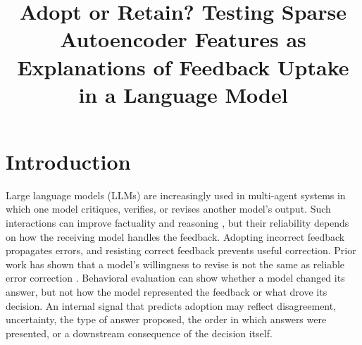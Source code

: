 \documentclass[pdflatex,sn-mathphys-num]{sn-jnl}
\theoremstyle{thmstylethree}%
\begin{document}
\title[Adopt or Retain?]{Adopt or Retain? Testing Sparse Autoencoder Features
as Explanations of Feedback Uptake in a Language Model}

\author[1]{ }
\author[1]{ }
\author[1]{ }
\author[1]{ }





\maketitle

\section{Introduction}\label{sec:introduction}

Large language models (LLMs) are increasingly used in multi-agent systems in which one model critiques, verifies, or revises another model's output.
Such interactions can improve factuality and reasoning \cite{du2024debate}, but their reliability depends on how the receiving model handles the feedback.
Adopting incorrect feedback propagates errors, and resisting correct feedback prevents useful correction. Prior work has shown that a model's willingness
to revise is not the same as reliable error correction \cite{huang2024selfcorrect,sharma2024sycophancy}. Behavioral evaluation can show whether a model
changed its answer, but not how the model represented the feedback or what drove its decision. An internal signal that predicts adoption may reflect
disagreement, uncertainty, the type of answer proposed, the order in which answers were presented, or a downstream consequence of the decision itself.
\end{document}
